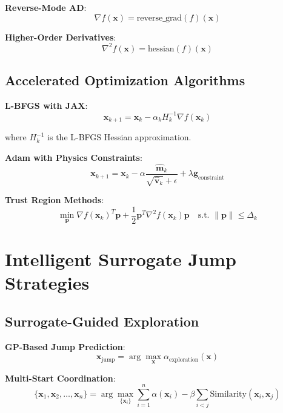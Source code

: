\documentclass[11pt,a4paper]{article}
\begin{document}
\textbf{Reverse-Mode AD}:
\begin{equation}
\nabla f(\mathbf{x}) = \text{reverse\_grad}(f)(\mathbf{x})
\end{equation}

\textbf{Higher-Order Derivatives}:
\begin{equation}
\nabla^2 f(\mathbf{x}) = \text{hessian}(f)(\mathbf{x})
\end{equation}

\subsection{Accelerated Optimization Algorithms}

\textbf{L-BFGS with JAX}:
\begin{equation}
\mathbf{x}_{k+1} = \mathbf{x}_k - \alpha_k H_k^{-1} \nabla f(\mathbf{x}_k)
\end{equation}

where $H_k^{-1}$ is the L-BFGS Hessian approximation.

\textbf{Adam with Physics Constraints}:
\begin{equation}
\mathbf{x}_{k+1} = \mathbf{x}_k - \alpha \frac{\hat{\mathbf{m}}_k}{\sqrt{\hat{\mathbf{v}}_k} + \epsilon} + \lambda \mathbf{g}_{\text{constraint}}
\end{equation}

\textbf{Trust Region Methods}:
\begin{equation}
\min_{\mathbf{p}} \nabla f(\mathbf{x}_k)^T \mathbf{p} + \frac{1}{2} \mathbf{p}^T \nabla^2 f(\mathbf{x}_k) \mathbf{p} \quad \text{s.t. } \|\mathbf{p}\| \leq \Delta_k
\end{equation}

\section{Intelligent Surrogate Jump Strategies}

\subsection{Surrogate-Guided Exploration}

\textbf{GP-Based Jump Prediction}:
\begin{equation}
\mathbf{x}_{\text{jump}} = \arg\max_{\mathbf{x}} \alpha_{\text{exploration}}(\mathbf{x})
\end{equation}

\textbf{Multi-Start Coordination}:
\begin{equation}
\{\mathbf{x}_1, \mathbf{x}_2, \ldots, \mathbf{x}_n\} = \arg\max_{\{\mathbf{x}_i\}} \sum_{i=1}^n \alpha(\mathbf{x}_i) - \beta \sum_{i<j} \text{Similarity}(\mathbf{x}_i, \mathbf{x}_j)
\end{equation}
\end{document}
